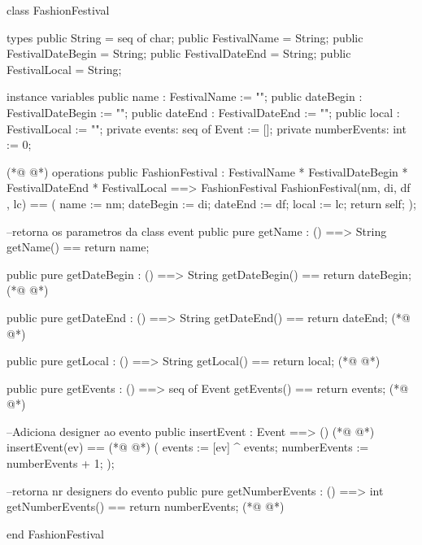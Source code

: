 \begin{vdmpp}[breaklines=true]
class FashionFestival
 
types
 public String = seq of char;
 public FestivalName = String;
 public FestivalDateBegin = String;
 public FestivalDateEnd = String;
 public FestivalLocal = String;

instance variables
 public  name : FestivalName := "";
 public  dateBegin : FestivalDateBegin := "";
 public  dateEnd : FestivalDateEnd := "";
 public  local : FestivalLocal := "";
 private  events: seq of Event := [];
 private  numberEvents: int := 0; 
 
(*@
\label{FashionFestival:18}
@*)
operations
 public FashionFestival : 
              FestivalName *
              FestivalDateBegin * 
              FestivalDateEnd *
              FestivalLocal            
              ==> FashionFestival
  FashionFestival(nm, di, df , lc) ==
  (
    name := nm;
    dateBegin := di;
    dateEnd := df;
    local := lc;    
    return self;
  );
  
  --retorna os parametros da class event
  public pure getName : () ==> String
    getName() == return name;
    
   public pure getDateBegin : () ==> String
     getDateBegin() == return dateBegin;
(*@
\label{getName:40}
@*)
  
  public pure getDateEnd : () ==> String
     getDateEnd() == return dateEnd;
(*@
\label{getDateBegin:43}
@*)
     
  public pure getLocal : () ==> String
     getLocal() == return local;
(*@
\label{getDateEnd:46}
@*)
  
  public pure getEvents : () ==> seq of Event
     getEvents() == return events;
(*@
\label{getLocal:49}
@*)
     
 --Adiciona designer ao evento
 public insertEvent : Event ==> ()
(*@
\label{getEvents:52}
@*)
  insertEvent(ev) ==
(*@
\label{insertEvent:53}
@*)
  (
    events := [ev] ^ events;
    numberEvents := numberEvents + 1;
  );
  
 --retorna nr designers do evento
  public pure getNumberEvents : () ==> int
  getNumberEvents() == return numberEvents;
(*@
\label{getNumberEvents:61}
@*)
  
end FashionFestival
\end{vdmpp}
\bigskip
